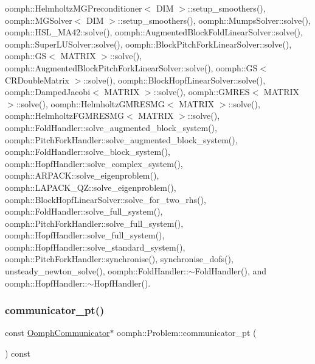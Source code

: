 oomph\+::\+Helmholtz\+M\+G\+Preconditioner$<$ D\+I\+M $>$\+::setup\+\_\+smoothers(), oomph\+::\+M\+G\+Solver$<$ D\+I\+M $>$\+::setup\+\_\+smoothers(), oomph\+::\+Mumps\+Solver\+::solve(), oomph\+::\+H\+S\+L\+\_\+\+M\+A42\+::solve(), oomph\+::\+Augmented\+Block\+Fold\+Linear\+Solver\+::solve(), oomph\+::\+Super\+L\+U\+Solver\+::solve(), oomph\+::\+Block\+Pitch\+Fork\+Linear\+Solver\+::solve(), oomph\+::\+G\+S$<$ M\+A\+T\+R\+I\+X $>$\+::solve(), oomph\+::\+Augmented\+Block\+Pitch\+Fork\+Linear\+Solver\+::solve(), oomph\+::\+G\+S$<$ C\+R\+Double\+Matrix $>$\+::solve(), oomph\+::\+Block\+Hopf\+Linear\+Solver\+::solve(), oomph\+::\+Damped\+Jacobi$<$ M\+A\+T\+R\+I\+X $>$\+::solve(), oomph\+::\+G\+M\+R\+E\+S$<$ M\+A\+T\+R\+I\+X $>$\+::solve(), oomph\+::\+Helmholtz\+G\+M\+R\+E\+S\+M\+G$<$ M\+A\+T\+R\+I\+X $>$\+::solve(), oomph\+::\+Helmholtz\+F\+G\+M\+R\+E\+S\+M\+G$<$ M\+A\+T\+R\+I\+X $>$\+::solve(), oomph\+::\+Fold\+Handler\+::solve\+\_\+augmented\+\_\+block\+\_\+system(), oomph\+::\+Pitch\+Fork\+Handler\+::solve\+\_\+augmented\+\_\+block\+\_\+system(), oomph\+::\+Fold\+Handler\+::solve\+\_\+block\+\_\+system(), oomph\+::\+Hopf\+Handler\+::solve\+\_\+complex\+\_\+system(), oomph\+::\+A\+R\+P\+A\+C\+K\+::solve\+\_\+eigenproblem(), oomph\+::\+L\+A\+P\+A\+C\+K\+\_\+\+Q\+Z\+::solve\+\_\+eigenproblem(), oomph\+::\+Block\+Hopf\+Linear\+Solver\+::solve\+\_\+for\+\_\+two\+\_\+rhs(), oomph\+::\+Fold\+Handler\+::solve\+\_\+full\+\_\+system(), oomph\+::\+Pitch\+Fork\+Handler\+::solve\+\_\+full\+\_\+system(), oomph\+::\+Hopf\+Handler\+::solve\+\_\+full\+\_\+system(), oomph\+::\+Hopf\+Handler\+::solve\+\_\+standard\+\_\+system(), oomph\+::\+Pitch\+Fork\+Handler\+::synchronise(), synchronise\+\_\+dofs(), unsteady\+\_\+newton\+\_\+solve(), oomph\+::\+Fold\+Handler\+::$\sim$\+Fold\+Handler(), and oomph\+::\+Hopf\+Handler\+::$\sim$\+Hopf\+Handler().

\mbox{\label{classoomph_1_1Problem_af1875e771e99a2e8f1d344d8b880d0de}} 
\subsubsection{\texorpdfstring{communicator\+\_\+pt()}{communicator\_pt()}\hspace{0.1cm}{\footnotesize\ttfamily [2/2]}}
{\footnotesize\ttfamily const \hyperlink{classoomph_1_1OomphCommunicator}{Oomph\+Communicator}$\ast$ oomph\+::\+Problem\+::communicator\+\_\+pt (\begin{DoxyParamCaption}{ }\end{DoxyParamCaption}) const\hspace{0.3cm}{\ttfamily [inline]}}



